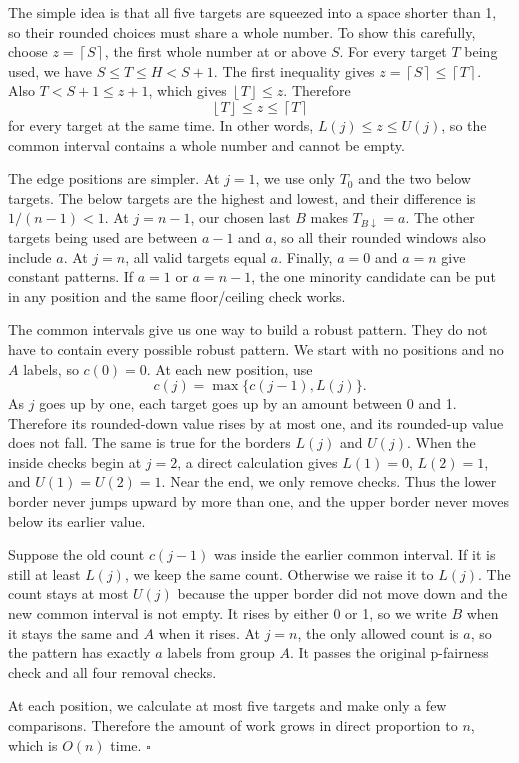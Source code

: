 \documentclass[11pt]{article}
\newcommand{\floor}[1]{\left\lfloor #1\right\rfloor}
\newcommand{\ceil}[1]{\left\lceil #1\right\rceil}
\begin{document}
The simple idea is that all five targets are squeezed into a space shorter
than 1, so their rounded choices must share a whole number.  To show this
carefully, choose $z=\ceil{S}$, the first whole number at or above $S$.  For
every target $T$ being used, we have $S\le T\le H<S+1$.  The first inequality
gives $z=\ceil{S}\le\ceil{T}$.  Also $T<S+1\le z+1$, which gives
$\floor{T}\le z$.  Therefore
\[
 \floor{T}\le z\le\ceil{T}
\]
for every target at the same time.  In other words,
$L(j)\le z\le U(j)$, so the common interval contains a whole number and cannot
be empty.

The edge positions are simpler.  At $j=1$, we use only $T_0$ and the two below
targets.  The below targets are the highest and lowest, and their
difference is $1/(n-1)<1$.  At $j=n-1$, our chosen last $B$ makes
$T_{B\downarrow}=a$.  The other targets being used are between $a-1$ and $a$,
so all their rounded windows also include $a$.  At $j=n$, all valid targets
equal $a$.  Finally, $a=0$ and $a=n$ give constant patterns.  If $a=1$ or
$a=n-1$, the one minority candidate can be put in any position and the same
floor/ceiling check works.

The common intervals give us one way to build a robust pattern.  They do not
have to contain every possible robust pattern.  We start with no positions
and no $A$ labels, so $c(0)=0$.  At each new position, use
\[
  c(j)=\max\{c(j-1),L(j)\}.
\]
As $j$ goes up by one, each target goes up by an amount between 0 and 1.
Therefore its rounded-down value rises by at most one, and its rounded-up
value does not fall.  The same is true for the borders $L(j)$ and $U(j)$.
When the inside checks begin at $j=2$, a direct calculation gives
$L(1)=0$, $L(2)=1$, and $U(1)=U(2)=1$.  Near the end, we only remove checks.
Thus the lower border never jumps upward by more than one, and the upper border
never moves below its earlier value.

Suppose the old count $c(j-1)$ was inside the earlier common interval.  If it
is still at least $L(j)$, we keep the same count.  Otherwise we raise it to
$L(j)$.  The count stays at most $U(j)$ because the upper border did not move
down and the new common interval is not empty.  It rises by either 0 or 1, so
we write $B$ when it stays the same and $A$ when it rises.  At $j=n$, the only
allowed count is $a$, so the pattern has exactly $a$ labels from group $A$.
It passes the original p-fairness check and all four removal checks.

At each position, we calculate at most five targets and make only a few
comparisons.  Therefore the amount of work grows in direct proportion to
$n$, which is $O(n)$ time.
\hfill\(\square\)
\end{document}
